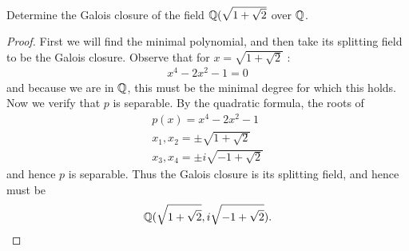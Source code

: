\documentclass[num=12,duedate=04-28-21,course=Algebra\ II,proflastname=Walton]{hwtemplate}
\begin{document}
\begin{claim} %
	Determine the Galois closure of the field \(\mathbb{Q}(\sqrt{1+\sqrt{2} } \) over \(\mathbb{Q}\).	
\end{claim}
\begin{proof}
	First we will find the minimal polynomial, and then take its splitting field to be the Galois closure. Observe that for \(x = \sqrt{1+\sqrt{2} } \) :
	\begin{align*}
		x^{4}-2x^2-1 = 0
	\end{align*}
	and because we are in \(\mathbb{Q}\), this must be the minimal degree for which this holds. Now we verify that \(p\) is separable. By the quadratic formula, the roots of
	\begin{align*}
		p(x) = x^{4}-2x^2-1\\
		x_1,x_2 = \pm \sqrt{1+\sqrt{2} } \\
		x_3, x_4 = \pm i \sqrt{-1 + \sqrt{2} }  
	\end{align*}
	and hence \(p\) is separable. Thus the Galois closure is its splitting field, and hence must be
	\begin{align*}
		\mathbb{Q}(\sqrt{1+\sqrt{2} } , i \sqrt{-1 + \sqrt{2} } ).
	\end{align*}
\end{proof}
\separator
\end{document}
